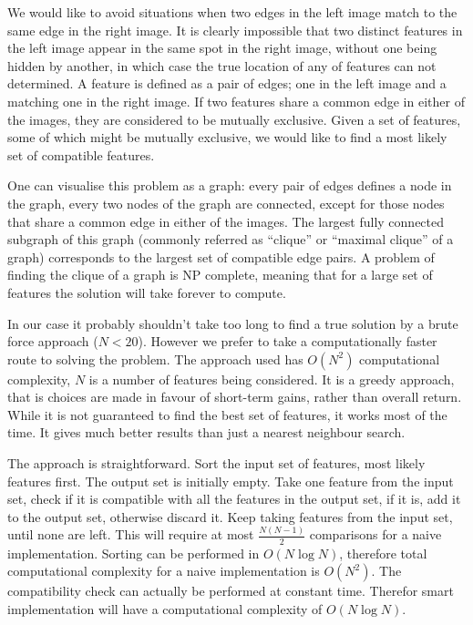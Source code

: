 We would like to avoid situations when two edges in the left image
match to the same edge in the right image. It is clearly impossible
that two distinct features in the left image appear in the same spot
in the right image, without one being hidden by another, in which case
the true location of any of features can not determined. A feature
is defined as a pair of edges; one in the left image and a matching one
in the right image. If two features share a common edge in either of
the images, they are considered to be mutually exclusive.  Given a set
of features, some of which might be mutually exclusive, we would like
to find a most likely set of compatible features.

One can visualise this problem as a graph: every pair of edges defines
a node in the graph, every two nodes of the graph are connected,
except for those nodes that share a common edge in either of the
images. The largest fully connected subgraph of this graph (commonly
referred as ``clique'' or ``maximal clique'' of a graph) corresponds
to the largest set of compatible edge pairs. A problem of finding the
clique of a graph is NP complete, meaning that for a large set of
features the solution will take forever to compute.

In our case it probably shouldn't take too long to find a true
solution by a brute force approach ($N<20$). However we prefer to take a computationally faster
route to solving the problem. The approach used has $O(N^2)$
computational complexity, $N$ is a number of features being
considered. It is a greedy approach, that is choices are made in
favour of short-term gains, rather than overall return.  While it is
not guaranteed to find the best set of features, it works most of the
time. It gives much better results than just a nearest neighbour
search. 

The approach is straightforward. Sort the input set of features, most
likely features first. The output
set is initially empty. Take one feature from the input set, check if
it is compatible with all the features in the output set, if it is,
add it to the output set, otherwise discard it.  Keep taking features
from the input set, until none are left. This will require at most
$\frac{N(N-1)}{2}$ comparisons for a naive implementation.  Sorting
can be performed in $O(N\log N)$, therefore total computational
complexity for a naive implementation is $O(N^2)$. The compatibility
check can actually be performed at constant time. Therefor smart
implementation will have a computational complexity of $O(N\log N)$.


